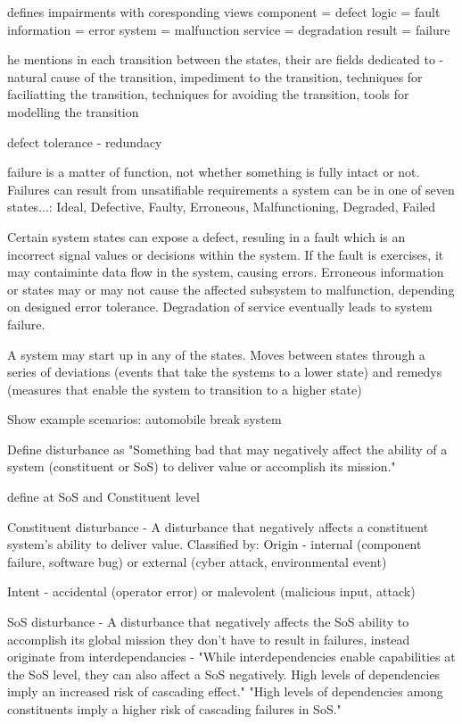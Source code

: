 

\cite{parhami1994multi}
defines impairments with coresponding views
component = defect
logic = fault
information = error
system = malfunction
service = degradation
result = failure

he mentions in each transition between the states, their are fields dedicated to - natural cause of the transition, impediment to the transition, techniques for faciliatting the transition, techniques for avoiding the transition, tools for modelling the transition

defect tolerance - redundacy


\cite{parhami2002defect}
failure is a matter of function, not whether something is fully intact or not. Failures can result from unsatifiable requirements
a system can be in one of seven states...: Ideal, Defective, Faulty, Erroneous, Malfunctioning, Degraded, Failed

Certain system states can expose a defect, resuling in a fault which is an incorrect signal values or decisions within the system. If the fault is exercises, it may contaiminte data flow in the system, causing errors. Erroneous information or states may or may not cause the affected subsystem to malfunction, depending on designed error tolerance. Degradation of service eventually leads to system failure.

A system may start up in any of the states. Moves between states through a series of deviations (events that take the systems to a lower state) and remedys (measures that enable the system to transition to a higher state)

Show example scenarios:
automobile break system

\cite{ferreira2023towards}
Define disturbance as "Something bad that may negatively affect the ability of a system (constituent or SoS) to deliver value or accomplish its mission."

define at SoS and Constituent level

Constituent disturbance - A disturbance that negatively affects a constituent system's ability to deliver value.
Classified by:
Origin - internal (component failure, software bug) or external (cyber attack, environmental event)

Intent - accidental (operator error) or malevolent (malicious input, attack)

SoS disturbance - A disturbance that negatively affects the SoS ability to accomplish its global mission
they don't have to result in failures, instead originate from 
interdependancies - 
"While interdependencies enable capabilities at the SoS level, they can also affect a SoS negatively. High levels of dependencies imply an increased risk of cascading effect."
"High levels of dependencies among constituents imply a higher risk of cascading failures in SoS."

